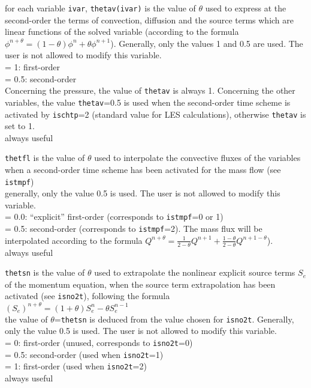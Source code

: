 {for each variable {\tt ivar}, {\tt thetav(ivar)} is the value of $\theta$ used to
express at the second-order the terms of convection, diffusion and the
source terms which are linear functions of the solved variable
(according to the formula
$\phi^{n+\theta}=(1-\theta)\phi^n+\theta\phi^{n+1}$). Generally,
only the values 1 and 0.5 are used. The user is not allowed to modify
this variable.\\
\hspace*{1.3cm}= 1: first-order \\
\hspace*{1.3cm}= 0.5: second-order \\
Concerning the pressure, the value of {\tt thetav} is always 1. Concerning
the other variables, the value {\tt thetav}=0.5 is used when the
second-order time scheme is activated by {\tt ischtp}=2 (standard value for
LES calculations), otherwise {\tt thetav} is set to 1.\\
always useful}

{{\tt thetfl} is the value of $\theta$ used to
interpolate the convective fluxes of the variables when a second-order time
scheme has been activated for the mass flow (see {\tt istmpf})\\
generally, only the value 0.5 is used. The user is not allowed to
modify this variable.\\
\hspace*{1.3cm}= 0.0: ``explicit'' first-order (corresponds to
{\tt istmpf}=0 or 1)\\
\hspace*{1.3cm}= 0.5: second-order (corresponds to {\tt istmpf}=2). The mass
flux will be interpolated according to the formula
$Q^{n+\theta}=\frac{1}{2-\theta}Q^{n+1}+\frac{1-\theta}{2-\theta}Q^{n+1-\theta}$).\\
always useful}

{{\tt thetsn} is the value of $\theta$ used to
extrapolate the nonlinear explicit source terms $S_e$ of the momentum equation,
when the source term extrapolation has been activated (see {\tt isno2t}),
following the formula\\
$(S_e)^{n+\theta}=(1+\theta)S_e^n-\theta S_e^{n-1}$\\
the value
of $\theta$={\tt thetsn} is deduced from the value chosen for
{\tt isno2t}. Generally, only the value 0.5 is used. The user is not
allowed to modify this variable.\\
\hspace*{1.3cm}= 0: first-order (unused, corresponds to {\tt isno2t}=0) \\
\hspace*{1.3cm}= 0.5: second-order (used when {\tt isno2t}=1) \\
\hspace*{1.3cm}= 1: first-order (used when {\tt isno2t}=2) \\
always useful}

